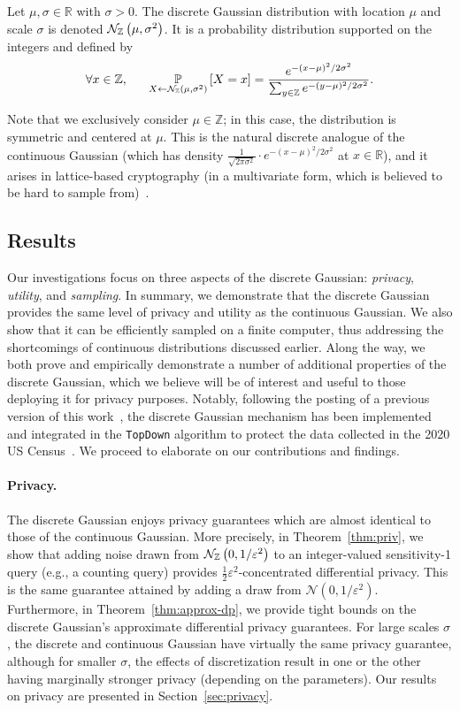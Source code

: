\documentclass{jpc}
\newcommand{\dgausss}[2]{{\discN\left(#1,#2\right)}}
\newcommand{\dgauss}[1]{\dgausss{0}{#1}}
\newcommand{\pr}[2]{{\ifx&#1& \mathbb{P} \else
\underset{#1}{\mathbb{P}} \fi \left[#2\right]}}
\newcommand{\eps}{\varepsilon}
\newcommand{\Z}{\mathbb{Z}}
\newcommand{\R}{\mathbb{R}}
\begin{document}
\begin{defi}
Let $\mu,\sigma\in\R$ with $\sigma > 0$. The discrete Gaussian distribution with location $\mu$ and scale $\sigma$ is denoted $\dgausss{\mu}{\sigma^2}$. It is a probability distribution supported on the integers and defined by 
\begin{equation}
\forall x \in \Z, ~~~~~ \pr{X \gets \dgausss{\mu}{\sigma^2}}{X=x}=\frac{e^{-(x-\mu)^2/2\sigma^2}}{\sum_{y \in \Z} e^{-(y-\mu)^2/2\sigma^2}}.
\end{equation}
\end{defi}
Note that we exclusively consider $\mu \in \Z$; in this case, the distribution is symmetric and centered at $\mu$. This is the natural discrete analogue of the continuous Gaussian (which has density $\frac{1}{\sqrt{2\pi\sigma^2}} \cdot e^{-(x-\mu)^2/2\sigma^2}$ at $x \in \R$), and it arises in lattice-based cryptography (in a multivariate form, which is believed to be hard to sample from)~\cite[etc.]{GentryPV08,Regev09,Peikert10,Stephens-Davidowitz17}.

\subsection{Results}

Our investigations focus on three aspects of the discrete Gaussian: \emph{privacy}, \emph{utility}, and \emph{sampling}. In summary, we demonstrate that the discrete Gaussian provides the same level of privacy and utility as the continuous Gaussian. We also show that it can be efficiently sampled on a finite computer, thus addressing the shortcomings of continuous distributions discussed earlier. Along the way, we both prove and empirically demonstrate a number of additional properties of the discrete Gaussian, which we believe will be of interest and useful to those deploying it for privacy purposes. Notably, following the posting of a previous version of this work~\cite{CKS20}, the discrete Gaussian mechanism has been implemented and integrated in the \texttt{TopDown} algorithm to protect the data collected in the 2020 US Census~\citep{DAS21}. We proceed to elaborate on our contributions and findings.

\paragraph{Privacy.} The discrete Gaussian enjoys privacy guarantees which are almost identical to those of the continuous Gaussian. More precisely, in Theorem~\ref{thm:priv}, we show that adding noise drawn from $\dgauss{1/\eps^2}$ to an integer-valued sensitivity-1 query (e.g., a counting query) provides $\frac12 \eps^2$-concentrated differential privacy. This is the same guarantee attained by adding a draw from $\mathcal{N}(0,1/\eps^2)$. Furthermore, in Theorem~\ref{thm:approx-dp}, we provide tight bounds on the discrete Gaussian's approximate differential privacy guarantees. For large scales $\sigma$, the discrete and continuous Gaussian have virtually the same privacy guarantee, although for smaller $\sigma$, the effects of discretization result in one or the other having marginally stronger privacy (depending on the parameters). Our results on privacy are presented in Section~\ref{sec:privacy}.
\end{document}
